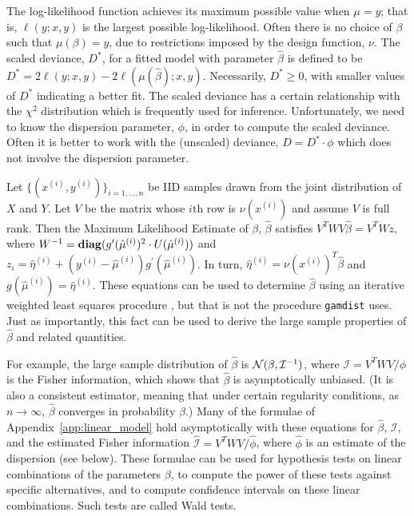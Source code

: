 \documentclass[12pt]{article}
\newcommand{\gamdist}{\texttt{gamdist}}
\begin{document}
The log-likelihood function achieves its maximum possible value when $\mu = y$; that is, $\ell(y; x, y)$ is the largest possible log-likelihood. Often there is no choice of $\beta$ such that $\mu(\beta) = y$, due to restrictions imposed by the design function, $\nu$. The scaled deviance, $D^*$, for a fitted model with parameter $\hat{\beta}$ is defined to be $D^* = 2 \ell(y; x, y) - 2 \ell(\mu(\hat{\beta}); x, y)$. Necessarily, $D^* \geq 0$, with smaller values of $D^*$ indicating a better fit. The scaled deviance has a certain relationship with the $\chi^2$ distribution which is frequently used for inference. Unfortunately, we need to know the dispersion parameter, $\phi$, in order to compute the scaled deviance. Often it is better to work with the (unscaled) deviance, $D = D^* \cdot \phi$ which does not involve the dispersion parameter.

Let $\{ (x^{(i)}, y^{(i)}) \}_{i=1, \ldots, n}$ be IID samples drawn from the joint distribution of $X$ and $Y$. Let $V$ be the matrix whose $i$th row is $\nu(x^{(i)})$ and assume $V$ is full rank. Then the Maximum Likelihood Estimate of $\beta$, $\hat{\beta}$ satisfies $V^T W V \hat{\beta} = V^T W z$, where $W^{-1} = \mathop{\bf diag}(g^\prime(\hat{\mu}^{(i)})^2 \cdot U(\hat{\mu}^{(i)}))$ and $z_i = \hat{\eta}^{(i)} + (y^{(i)} - \hat{\mu}^{(i)}) g^\prime(\hat{\mu}^{(i)})$. In turn, $\hat{\eta}^{(i)} = \nu(x^{(i)})^T \hat{\beta}$ and $g(\hat{\mu}^{(i)}) = \hat{\eta}^{(i)}$. These equations can be used to determine $\hat{\beta}$ using an iterative weighted least squares procedure \cite[\S 2.5]{MN:1983}, but that is not the procedure \gamdist{} uses. Just as importantly, this fact can be used to derive the large sample properties of $\hat{\beta}$ and related quantities.

For example, the large sample distribution of $\hat{\beta}$ is ${\mathcal N}(\beta,  \mathcal{I}^{-1})$, where $\mathcal{I} = V^T W V / \phi$ is the Fisher information, which shows that $\hat{\beta}$ is asymptotically unbiased. (It is also a consistent estimator, meaning that under certain regularity conditions, as $n \to \infty$, $\hat{\beta}$ converges in probability $\beta$.) Many of the formulae of Appendix~\ref{app:linear_model} hold asymptotically with these equations for $\hat{\beta}$, $\mathcal{I}$, and the estimated Fisher information $\hat{\mathcal{I}} = V^T W V / \hat{\phi}$, where $\hat{\phi}$ is an estimate of the dispersion (see below). These formulae can be used for hypothesis tests on linear combinations of the parameters $\beta$, to compute the power of these tests against specific alternatives, and to compute confidence intervals on these linear combinations. Such tests are called Wald tests.
\end{document}
